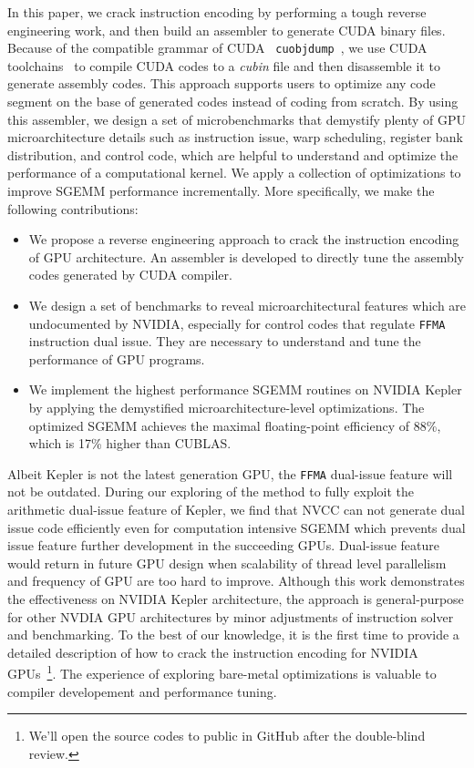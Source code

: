 In this paper, we crack instruction encoding by performing a tough reverse engineering work, and then build an 
assembler to generate CUDA binary files. Because of the compatible grammar of CUDA {\tt 
cuobjdump}~\cite{cubin2015util}, we use CUDA toolchains~\cite{nvcc} to compile CUDA codes to a {\em cubin} file and 
then disassemble it to generate assembly codes. This approach supports users to optimize any code segment on the base 
of generated codes instead of coding from scratch. By using this assembler, we design a set of microbenchmarks that 
demystify plenty of GPU microarchitecture details such as instruction issue, warp scheduling, register bank distribution, 
and control code, which are helpful to understand and optimize the performance of a computational kernel. We apply a collection of 
optimizations to improve SGEMM performance incrementally. More specifically, we make the following contributions:
\begin{itemize}
\item We propose a reverse engineering approach to crack the instruction encoding of GPU architecture.
An assembler is developed to directly tune the assembly codes generated by CUDA compiler.
\item We design a set of benchmarks to reveal microarchitectural features which are undocumented by NVIDIA, 
especially for control codes that regulate {\tt FFMA} instruction dual issue.
They are necessary to understand and tune the performance of GPU programs.
\item We implement the highest performance SGEMM routines on NVIDIA Kepler by applying the demystified 
microarchitecture-level optimizations. The optimized SGEMM achieves the maximal floating-point efficiency of 88\%, 
which is 17\% higher than CUBLAS.
\end{itemize}

Albeit Kepler is not the latest generation GPU, the {\tt FFMA} dual-issue feature will not be
outdated. During our exploring of the method to fully exploit the arithmetic
dual-issue feature of Kepler, we find that NVCC can not generate dual issue code efficiently even for computation
intensive SGEMM which prevents dual issue feature further development in the succeeding GPUs. Dual-issue feature would return in future
GPU design when scalability of thread level parallelism and frequency of GPU are too hard to improve.
Although this work demonstrates the effectiveness on NVIDIA Kepler architecture, the approach is general-purpose for 
other NVDIA GPU architectures by minor adjustments of instruction solver and benchmarking. To the best of our 
knowledge, it is the first time to provide a detailed description of how to crack the instruction encoding for NVIDIA 
GPUs~\footnote{We'll open the source codes to public in GitHub after the double-blind review.}. The experience of 
exploring bare-metal optimizations is valuable to compiler developement and performance tuning.

